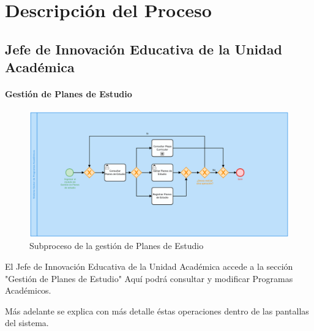 \chapter{Descripción del Proceso}
        \section{Jefe de Innovación Educativa de la Unidad Académica}
        \subsubsection{Gestión de Planes de Estudio}
        \begin{figure}[!hbtp]
            \centering
            \hypertarget{BPMNGPE}{\includegraphics[width=\linewidth]{images/SP4-GPE/gestionPE}}
            \caption{Subproceso de la gestión de Planes de Estudio}
            \label{BPMNGPE}
        \end{figure}
        El Jefe de Innovación Educativa de la Unidad Académica accede a la sección "Gestión de Planes de Estudio" Aquí podrá consultar y modificar Programas Académicos.

        Más adelante se explica con más detalle éstas operaciones dentro de las pantallas del sistema.